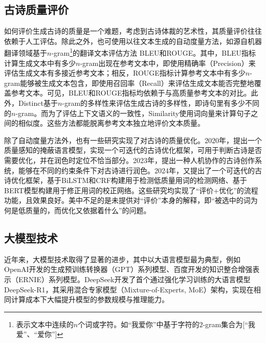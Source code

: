 \subsection{古诗质量评价}
如何评价生成古诗的质量是一个难题，考虑到古诗体裁的艺术性，其质量评价往往依赖于人工评估。除此之外，也可使用以往文本生成的自动度量方法，如源自机器翻译领域基于$n$-gram\footnote{表示文本中连续的$n$个词或字符。如“我爱你”中基于字符的$2$-gram集合为[“我爱”、“爱你”]}的翻译文本评估方法
BLEU\cite{papineniBLEUMethodAutomatic2002}和ROUGE\cite{linROUGEPackageAutomatic2004}。其中，BLEU指标计算生成文本中有多少$n$-gram出现在参考文本中，即使用精确率（Precision）来评估生成文本有多接近参考文本；相反，ROUGE指标计算参考文本中有多少$n$-gram能够被生成文本包含，即使用召回率（Recall）来评估生成文本能否完整地覆盖参考文本。可见，BLEU和ROUGE指标均依赖于与高质量参考文本的对比。此外，Distinct\cite{liDiversityPromotingObjectiveFunction2016}基于$n$-gram的多样性来评估生成古诗的多样性，即诗句里有多少不同的$n$-gram。而为了评估上下文语义的一致性，Similarity\cite{wietingUniversalParaphrasticSentence2016a}使用词向量来计算句子之间的相似度。这些方法都能脱离参考文本独立地评价文本质量。

除了自动度量方法外，也有一些研究实现了对古诗的质量优化。2020年，\cite{dengIterativePolishingFramework2020}提出一个质量感知的掩蔽语言模型，实现一个可迭代的古诗优化框架，可用于判断古诗是否需要优化，并在润色时定位不恰当部分。2023年，\cite{maYuShengHumaninLoop2023}提出一种人机协作的古诗创作系统，能够在不同的约束条件下对古诗进行润色。2024年，\cite{chenPolishingModelMachineGenerated2024}又提出了一个可迭代的古诗优化框架，基于BiLSTM和CRF构建用于检测低质量用词的检测网络、基于BERT模型构建用于修正用词的校正网络。这些研究均实现了“评价+优化”的流程功能，且效果良好。美中不足的是未提供对“评价”本身的解释，即“被选中的词为何是低质量的，而优化又依据着什么”的问题。

\subsection{大模型技术}
近年来，大模型技术取得了显著的进步，其中以大语言模型最为典型，例如OpenAI开发的生成预训练转换器（GPT）系列模型、百度开发的知识整合增强表示（ERNIE）系列模型\cite{zhangERNIEEnhancedLanguage2019}。DeepSeek开发了首个通过强化学习训练的大语言模型 DeepSeek-R1\cite{deepseek-aiDeepSeekR1IncentivizingReasoning2025}，其采用混合专家模型（Mixture-of-Experts, MoE）架构，实现在相同计算成本下大幅提升模型的参数规模与推理能力。

